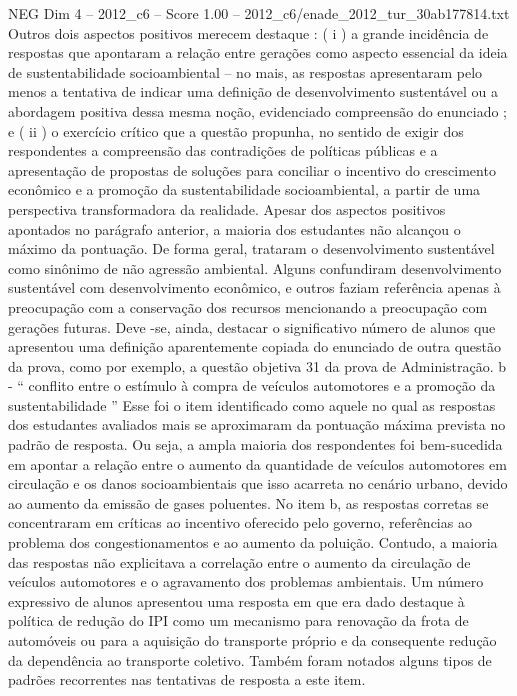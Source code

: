 \begin{textsample}{NEG Dim 4 – 2012\_c6 – Score 1.00 – 2012\_c6/enade\_2012\_tur\_30ab177814.txt}
Outros dois aspectos positivos merecem destaque : ( i ) a grande incidência de respostas que apontaram a relação entre gerações como aspecto essencial da ideia de sustentabilidade socioambiental – no mais, as respostas apresentaram pelo menos a tentativa de indicar uma definição de desenvolvimento sustentável ou a abordagem positiva dessa mesma noção, evidenciado compreensão do enunciado ; e ( ii ) o exercício crítico que a questão propunha, no sentido de exigir dos respondentes a compreensão das contradições de políticas públicas e a apresentação de propostas de soluções para conciliar o incentivo do crescimento econômico e a promoção da sustentabilidade socioambiental, a partir de uma perspectiva transformadora da realidade.
Apesar dos aspectos positivos apontados no parágrafo anterior, a maioria dos estudantes não alcançou o máximo da pontuação.
De forma geral, trataram o desenvolvimento sustentável como sinônimo de não agressão ambiental.
Alguns confundiram desenvolvimento sustentável com desenvolvimento econômico, e outros faziam referência apenas à preocupação com a conservação dos recursos mencionando a preocupação com gerações futuras.
Deve -se, ainda, destacar o significativo número de alunos que apresentou uma definição aparentemente copiada do enunciado de outra questão da prova, como por exemplo, a questão objetiva 31 da prova de Administração. b - “ conflito entre o estímulo à compra de veículos automotores e a promoção da sustentabilidade ” Esse foi o item identificado como aquele no qual as respostas dos estudantes avaliados mais se aproximaram da pontuação máxima prevista no padrão de resposta.
Ou seja, a ampla maioria dos respondentes foi bem-sucedida em apontar a relação entre o aumento da quantidade de veículos automotores em circulação e os danos socioambientais que isso acarreta no cenário urbano, devido ao aumento da emissão de gases poluentes.
No item b, as respostas corretas se concentraram em críticas ao incentivo oferecido pelo governo, referências ao problema dos congestionamentos e ao aumento da poluição.
Contudo, a maioria das respostas não explicitava a correlação entre o aumento da circulação de veículos automotores e o agravamento dos problemas ambientais.
Um número expressivo de alunos apresentou uma resposta em que era dado destaque à política de redução do IPI como um mecanismo para renovação da frota de automóveis ou para a aquisição do transporte próprio e da consequente redução da dependência ao transporte coletivo.
Também foram notados alguns tipos de padrões recorrentes nas tentativas de resposta a este item.

\end{textsample}
